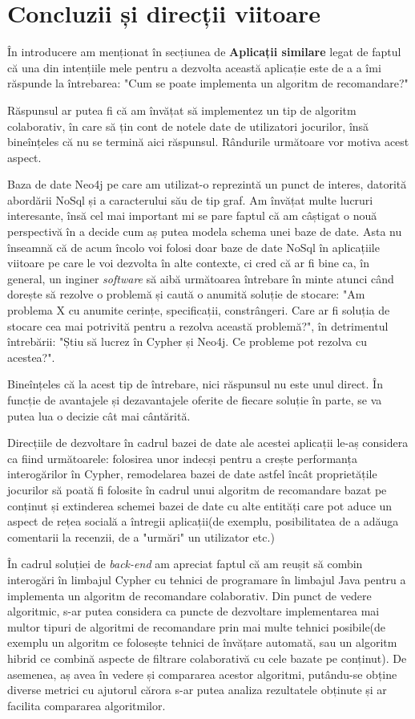 \documentclass[12pt,a4paper]{report}
\begin{document}
\section{Concluzii și direcții viitoare}

În introducere am menționat în secțiunea de \textbf{Aplicații similare} legat de faptul că una din intențiile mele pentru a dezvolta această aplicație este de a a îmi răspunde la întrebarea: "Cum se poate implementa un algoritm de recomandare?"

Răspunsul ar putea fi că am învățat să implementez un tip de algoritm colaborativ, în care să țin cont de notele date de utilizatori jocurilor, însă bineînțeles că nu se termină aici răspunsul. Rândurile următoare vor motiva acest aspect.

Baza de date Neo4j pe care am utilizat-o reprezintă un punct de interes, datorită abordării NoSql și a caracterului său de tip graf. Am învățat multe lucruri interesante, însă cel mai important mi se pare faptul că am câștigat o nouă perspectivă în a decide cum aș putea modela schema unei baze de date. Asta nu înseamnă că de acum încolo voi folosi doar baze de date NoSql în aplicațiile viitoare pe care le voi dezvolta în alte contexte, ci cred că ar fi bine ca, în general, un inginer \emph{software} să aibă următoarea întrebare în minte atunci când dorește să rezolve o problemă și caută o anumită soluție de stocare: "Am problema X cu anumite cerințe, specificații, constrângeri. Care ar fi soluția de stocare cea mai potrivită pentru a rezolva această problemă?", în detrimentul întrebării: "Știu să lucrez în Cypher și Neo4j. Ce probleme pot rezolva cu acestea?". 

Bineînțeles că la acest tip de întrebare, nici răspunsul nu este unul direct. În funcție de avantajele și dezavantajele oferite de fiecare soluție în parte, se va putea lua o decizie cât mai cântărită.

Direcțiile de dezvoltare în cadrul bazei de date ale acestei aplicații le-aș considera ca fiind următoarele: folosirea unor indecși pentru a crește performanța interogărilor în Cypher, remodelarea bazei de date astfel încât proprietățile jocurilor să poată fi folosite în cadrul unui algoritm de recomandare bazat pe conținut și extinderea schemei bazei de date cu alte entități care pot aduce un aspect de rețea socială a întregii aplicații(de exemplu, posibilitatea de a adăuga comentarii la recenzii, de a "urmări" un utilizator etc.)

În cadrul soluției de \emph{back-end} am apreciat faptul că am reușit să combin interogări în limbajul Cypher cu tehnici de programare în limbajul Java pentru a implementa un algoritm de recomandare colaborativ. Din punct de vedere algoritmic, s-ar putea considera ca puncte de dezvoltare implementarea mai multor tipuri de algoritmi de recomandare prin mai multe tehnici posibile(de exemplu un algoritm ce folosește tehnici de învățare automată, sau un algoritm hibrid ce combină aspecte de filtrare colaborativă cu cele bazate pe conținut). De asemenea, aș avea în vedere și compararea acestor algoritmi, putându-se obține diverse metrici cu ajutorul cărora s-ar putea analiza rezultatele obținute și ar facilita compararea algoritmilor.
\end{document}
